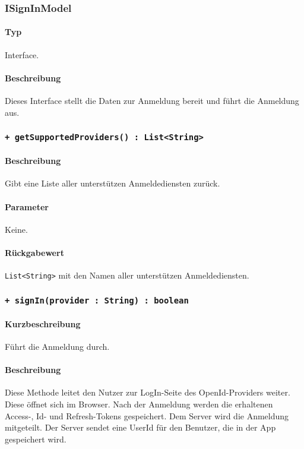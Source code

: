 \subsubsection{ISignInModel}
\paragraph*{Typ}
Interface.
\paragraph*{Beschreibung}
Dieses Interface stellt die Daten zur Anmeldung bereit und führt die Anmeldung aus.

\subsubsection{\texttt{+ getSupportedProviders() : List<String>}}%
\paragraph*{Beschreibung}
Gibt eine Liste aller unterstützen Anmeldediensten zurück.
\paragraph*{Parameter}
Keine.
\paragraph*{Rückgabewert}
\texttt{List<String>} mit den Namen aller unterstützen Anmeldediensten.

\subsubsection{\texttt{+ signIn(provider : String) : boolean}}%
\paragraph*{Kurzbeschreibung}
Führt die Anmeldung durch.
\paragraph*{Beschreibung}
Diese Methode leitet den Nutzer zur LogIn-Seite des OpenId-Providers weiter.
Diese öffnet sich im Browser. Nach der Anmeldung werden die erhaltenen Access-, Id- und Refresh-Tokens gespeichert.
Dem Server wird die Anmeldung mitgeteilt. Der Server sendet eine UserId für den Benutzer, die in der App gespeichert wird.
